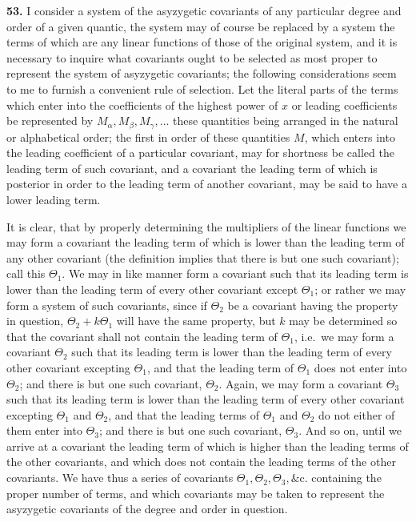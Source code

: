 \documentclass[11pt]{article}
\begin{document}
\textbf{53.} I consider a system of the asyzygetic covariants of any particular degree and order of a given quantic, the system may of course be replaced by a system the terms of which are any linear functions of those of the original system, and it is necessary to inquire what covariants ought to be selected as most proper to represent the system of asyzygetic covariants; the following considerations seem to me to furnish a convenient rule of selection. Let the literal parts of the terms which enter into the coefficients of the highest power of $x$ or leading coefficients be represented by $M_\alpha, M_\beta, M_\gamma, \ldots$ these quantities being arranged in the natural or alphabetical order; the first in order of these quantities $M$, which enters into the leading coefficient of a particular covariant, may for shortness be called the leading term of such covariant, and a covariant the leading term of which is posterior in order to the leading term of another covariant, may be said to have a lower leading term.

It is clear, that by properly determining the multipliers of the linear functions we may form a covariant the leading term of which is lower than the leading term of any other covariant (the definition implies that there is but one such covariant); call this $\Theta_1$. We may in like manner form a covariant such that its leading term is lower than the leading term of every other covariant except $\Theta_1$; or rather we may form a system of such covariants, since if $\Theta_2$ be a covariant having the property in question, $\Theta_2 + k\Theta_1$ will have the same property, but $k$ may be determined so that the covariant shall not contain the leading term of $\Theta_1$, i.e.\ we may form a covariant $\Theta_2$ such that its leading term is lower than the leading term of every other covariant excepting $\Theta_1$, and that the leading term of $\Theta_1$ does not enter into $\Theta_2$; and there is but one such covariant, $\Theta_2$. Again, we may form a covariant $\Theta_3$ such that its leading term is lower than the leading term of every other covariant excepting $\Theta_1$ and $\Theta_2$, and that the leading terms of $\Theta_1$ and $\Theta_2$ do not either of them enter into $\Theta_3$; and there is but one such covariant, $\Theta_3$. And so on, until we arrive at a covariant the leading term of which is higher than the leading terms of the other covariants, and which does not contain the leading terms of the other covariants. We have thus a series of covariants $\Theta_1, \Theta_2, \Theta_3, \&\text{c.}$ containing the proper number of terms, and which covariants may be taken to represent the asyzygetic covariants of the degree and order in question.
\end{document}
